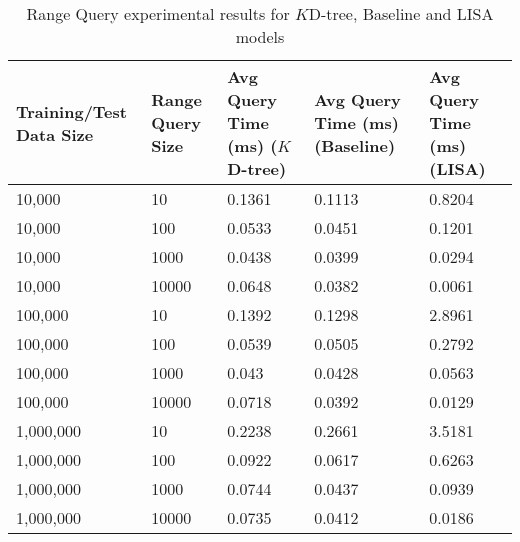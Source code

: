 \begin{table}
	\centering
\centering
	\begin{tabular}{||p{}<{\centering}|p{}<{\centering}|p{}<{\centering}|p{}<{\centering}|p{}<{\centering}||}
		\hline
		Training/Test Data Size& Range Query Size & Avg Query Time (ms) ($K$D-tree) & Avg Query Time (ms) (Baseline) &Avg Query Time (ms) (LISA)\\ [0.5ex] 
		\hline
		\hline
	 	10,000& 10& 0.1361 & 0.1113& 0.8204 \\
	 	\hline
	 	10,000& 100& 0.0533 & 0.0451& 0.1201 \\
	 	\hline
	 	10,000& 1000& 0.0438 & 0.0399& 0.0294 \\
 	 	\hline
 	 	10,000& 10000& 0.0648&0.0382&0.0061 \\
	 	\hline
	 	100,000& 10& 0.1392 & 0.1298&2.8961 \\
	 	\hline
	 	100,000& 100& 0.0539 & 0.0505&0.2792 \\
	 	\hline
	 	100,000& 1000& 0.043 & 0.0428&  0.0563 \\
 	 	\hline
 	 	100,000& 10000&0.0718& 0.0392& 0.0129 \\
	 	\hline
	    1,000,000& 10& 0.2238 & 0.2661& 3.5181 \\
	 	\hline
	 	1,000,000& 100& 0.0922 & 0.0617&0.6263 \\
	 	\hline
	 	1,000,000& 1000& 0.0744 & 0.0437 &0.0939 \\
	 	\hline
	 	1,000,000& 10000& 0.0735 & 0.0412 &0.0186 \\
	 	
	 
		\hline
		\hline
	\end{tabular}
	\caption{Range Query experimental results for $K$D-tree, Baseline and LISA models}
	\label{Range_Query_Experimental_Results}

\end{table}

